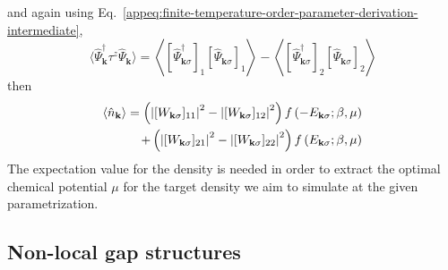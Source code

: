and again using Eq.~\eqref{appeq:finite-temperature-order-parameter-derivation-intermediate},
\[
	\langle \hat\Psi_\mathbf{k}^\dagger \tau^z \hat\Psi_\mathbf{k} \rangle = \left\langle [\hat \Psi_{\mathbf{k}\sigma}^\dagger]_1 [\hat \Psi_{\mathbf{k}\sigma}]_1 \right\rangle - \left\langle [\hat \Psi_{\mathbf{k}\sigma}^\dagger]_2 [\hat \Psi_{\mathbf{k}\sigma}]_2 \right\rangle
\]
then
\begin{equation}\label{eq:density-expectation}
\begin{aligned}
	\langle \hat n_\mathbf{k} \rangle = \left(
		\abs{[W_{\mathbf{k}\sigma}]_{11}}^2 - \abs{[W_{\mathbf{k}\sigma}]_{12}}^2
	\right) f\left( -E_{\mathbf{k}\sigma}; \beta,\mu \right)\\
	+ \left(
		\abs{[W_{\mathbf{k}\sigma}]_{21}}^2 - \abs{[W_{\mathbf{k}\sigma}]_{22}}^2
	\right) f\left( E_{\mathbf{k}\sigma}; \beta,\mu \right)
\end{aligned}
\end{equation}
The expectation value for the density is needed in order to extract the optimal chemical potential $\mu$ for the target density we aim to simulate at the given parametrization.

\subsection{Non-local gap structures}

